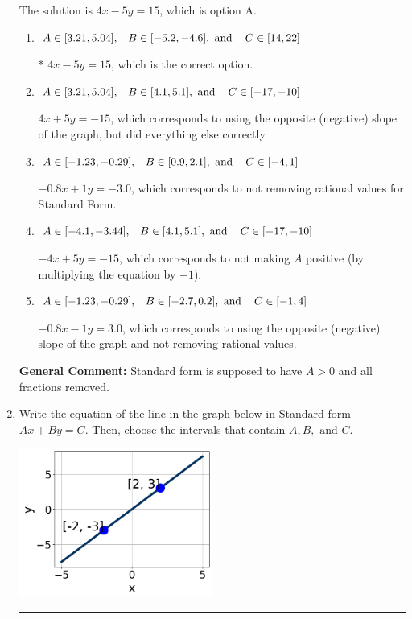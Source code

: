 \documentclass{extbook}[14pt]
\newcommand{\litem}[1]{\item #1

\rule{\textwidth}{0.4pt}}
\begin{document}
\begin{enumerate}
{The solution is \( 4x - 5y = 15 \), which is option A.\begin{enumerate}[label=\Alph*.]
\item \( A \in [3.21, 5.04], \hspace{3mm} B \in [-5.2, -4.6], \text{ and } \hspace{3mm} C \in [14, 22] \)

* $4x - 5y = 15$, which is the correct option.
\item \( A \in [3.21, 5.04], \hspace{3mm} B \in [4.1, 5.1], \text{ and } \hspace{3mm} C \in [-17, -10] \)

 $4x + 5y = -15$, which corresponds to using the opposite (negative) slope of the graph, but did everything else correctly.
\item \( A \in [-1.23, -0.29], \hspace{3mm} B \in [0.9, 2.1], \text{ and } \hspace{3mm} C \in [-4, 1] \)

 $-0.8x + 1y = -3.0$, which corresponds to not removing rational values for Standard Form.
\item \( A \in [-4.1, -3.44], \hspace{3mm} B \in [4.1, 5.1], \text{ and } \hspace{3mm} C \in [-17, -10] \)

 $-4x + 5y = -15$, which corresponds to not making $A$ positive (by multiplying the equation by $-1$).
\item \( A \in [-1.23, -0.29], \hspace{3mm} B \in [-2.7, 0.2], \text{ and } \hspace{3mm} C \in [-1, 4] \)

 $-0.8x - 1y = 3.0$, which corresponds to using the opposite (negative) slope of the graph and not removing rational values.
\end{enumerate}

\textbf{General Comment:} Standard form is supposed to have $A > 0$ and all fractions removed.
}
\litem{
Write the equation of the line in the graph below in Standard form $Ax+By=C$. Then, choose the intervals that contain $A, B, \text{ and } C$.

\begin{center}
    \includegraphics[width=0.5\textwidth]{../Figures/linearGraphToStandardCopyB.png}
\end{center}



}
\end{enumerate}
\end{document}
